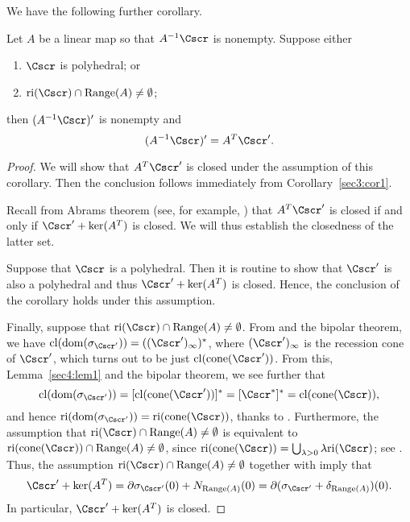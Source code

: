 \documentclass{siamltex}   %
\begin{document}
  We have the following further corollary.
  \begin{corollary}\label{sec3:cor2}
    Let $A$ be a linear map so that $A^{-1}\Cscr$ is nonempty. Suppose either
    \begin{enumerate}[{\rm (i)}]
      \item $\Cscr$ is polyhedral; or
      \item ${\rm ri}(\Cscr)\cap {\rm Range}(A)\neq\emptyset$;
    \end{enumerate}
    then $(A^{-1}\Cscr)'$ is nonempty and
    \begin{equation}\label{sec3:antipolarinvAC}
    (A^{-1}\Cscr)' = A^T\Cscr'.
    \end{equation}
  \end{corollary}
  \begin{proof}
    We will show that $A^T\Cscr'$ is closed under the assumption of this corollary.
    Then the conclusion follows immediately from Corollary~\ref{sec3:cor1}.

    Recall from Abrams theorem (see, for example, \cite[Lemma~3.1]{Berman:1973}) that $A^T\Cscr'$ is closed if
    and only if $\Cscr' + \ker(A^T)$ is closed. We will thus establish the closedness of the latter set.

    Suppose that $\Cscr$ is a polyhedral. Then it is routine to show that $\Cscr'$ is also a polyhedral and thus
    $\Cscr' + \ker(A^T)$ is closed. Hence, the conclusion of the corollary holds under this assumption.

    Finally, suppose that ${\rm ri}(\Cscr)\cap {\rm Range}(A)\neq\emptyset$.
    From \cite[Theorem~2.2.1]{AuT03} and the bipolar theorem, we have
    ${\rm cl}({\rm dom}(\sigma_{\Cscr'})) = ((\Cscr')_\infty)^*$, where $(\Cscr')_\infty$ is the recession cone of $\Cscr'$, which
    turns out to be just ${\rm cl}({\rm cone}(\Cscr'))$. From this, Lemma~\ref{sec4:lem1} and the bipolar theorem, we see further that
    \[
    {\rm cl}({\rm dom}(\sigma_{\Cscr'})) = [{\rm cl}({\rm cone}(\Cscr'))]^* = [\Cscr^*]^* = {\rm cl}({\rm cone}(\Cscr)),
    \]
    and hence ${\rm ri}({\rm dom}(\sigma_{\Cscr'})) = {\rm ri}({\rm cone}(\Cscr))$, thanks to \cite[Theorem~6.3]{Roc70}. Furthermore, the assumption that
    ${\rm ri}(\Cscr)\cap {\rm Range}(A)\neq \emptyset$ is equivalent to ${\rm ri}({\rm cone}(\Cscr))\cap {\rm Range}(A)\neq \emptyset$, since
    ${\rm ri}({\rm cone}(\Cscr)) = \bigcup_{\lambda > 0}\lambda{\rm ri}(\Cscr)$; see \cite[Page~50]{Roc70}. Thus, the assumption
    ${\rm ri}(\Cscr)\cap {\rm Range}(A)\neq\emptyset$ together with \cite[Theorem~23.8]{Roc70} imply that
    \begin{equation}\label{sec3:sum1}
      \Cscr' + \ker(A^T) = \partial \sigma_{\Cscr'}(0) + N_{{\rm Range}(A)}(0) = \partial(\sigma_{\Cscr'} + \delta_{{\rm Range}(A)})(0).
    \end{equation}
    In particular, $\Cscr' + \ker(A^T)$ is closed.
  \end{proof}
\end{document}

